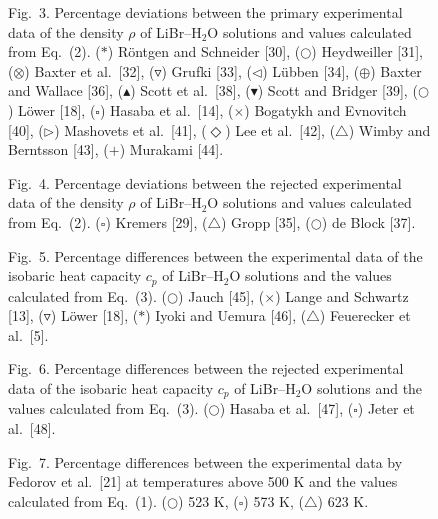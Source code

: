 \documentclass[11pt]{article}
\begin{document}
\begin{figure}[htbp]\centering
\caption*{Fig.~3. Percentage deviations between the primary
experimental data of the density $\rho$ of LiBr--H$_2$O solutions and
values calculated from Eq.~(2). ($*$) R\"ontgen and Schneider [30],
($\bigcirc$) Heydweiller [31], ($\otimes$) Baxter et al.\ [32],
($\triangledown$) Grufki [33], ($\triangleleft$) L\"ubben [34],
($\oplus$) Baxter and Wallace [36], ($\blacktriangle$) Scott et al.\ [38],
($\blacktriangledown$) Scott and Bridger [39], ($\bigcirc$) L\"ower [18],
($\square$) Hasaba et al.\ [14], ($\times$) Bogatykh and Evnovitch [40],
($\triangleright$) Mashovets et al.\ [41], ($\Diamond$) Lee et al.\ [42],
($\triangle$) Wimby and Berntsson [43], ($+$) Murakami [44].}
\end{figure}

\begin{figure}[htbp]\centering
\caption*{Fig.~4. Percentage deviations between the rejected
experimental data of the density $\rho$ of LiBr--H$_2$O solutions and
values calculated from Eq.~(2). ($\square$) Kremers [29],
($\triangle$) Gropp [35], ($\bigcirc$) de Block [37].}
\end{figure}

\begin{figure}[htbp]\centering
\caption*{Fig.~5. Percentage differences between the experimental data
of the isobaric heat capacity $c_p$ of LiBr--H$_2$O solutions and the
values calculated from Eq.~(3). ($\bigcirc$) Jauch [45],
($\times$) Lange and Schwartz [13], ($\triangledown$) L\"ower [18],
($*$) Iyoki and Uemura [46], ($\triangle$) Feuerecker et al.\ [5].}
\end{figure}

\begin{figure}[htbp]\centering
\caption*{Fig.~6. Percentage differences between the rejected
experimental data of the isobaric heat capacity $c_p$ of LiBr--H$_2$O
solutions and the values calculated from Eq.~(3).
($\bigcirc$) Hasaba et al.\ [47], ($\square$) Jeter et al.\ [48].}
\end{figure}

\begin{figure}[htbp]\centering
\caption*{Fig.~7. Percentage differences between the experimental data
by Fedorov et al.\ [21] at temperatures above 500 K and the values
calculated from Eq.~(1). ($\bigcirc$) 523 K, ($\square$) 573 K,
($\triangle$) 623 K.}
\end{figure}
\end{document}
